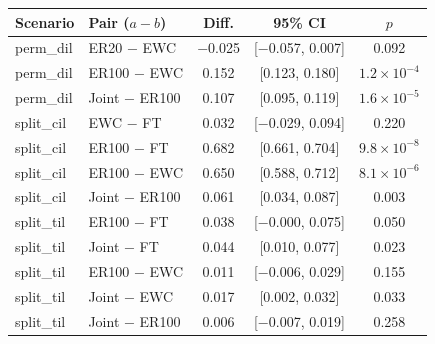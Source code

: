 \begin{tabular}{llccc}
\toprule
Scenario & Pair ($a-b$) & Diff. & 95\% CI & $p$ \\
\midrule
perm\_dil & ER20 $-$ EWC & $-$0.025 & [$-$0.057, 0.007] & 0.092 \\
perm\_dil & ER100 $-$ EWC & 0.152 & [0.123, 0.180] & $1.2{\times}10^{-4}$ \\
perm\_dil & Joint $-$ ER100 & 0.107 & [0.095, 0.119] & $1.6{\times}10^{-5}$ \\
\midrule
split\_cil & EWC $-$ FT & 0.032 & [$-$0.029, 0.094] & 0.220 \\
split\_cil & ER100 $-$ FT & 0.682 & [0.661, 0.704] & $9.8{\times}10^{-8}$ \\
split\_cil & ER100 $-$ EWC & 0.650 & [0.588, 0.712] & $8.1{\times}10^{-6}$ \\
split\_cil & Joint $-$ ER100 & 0.061 & [0.034, 0.087] & 0.003 \\
\midrule
split\_til & ER100 $-$ FT & 0.038 & [$-$0.000, 0.075] & 0.050 \\
split\_til & Joint $-$ FT & 0.044 & [0.010, 0.077] & 0.023 \\
split\_til & ER100 $-$ EWC & 0.011 & [$-$0.006, 0.029] & 0.155 \\
split\_til & Joint $-$ EWC & 0.017 & [0.002, 0.032] & 0.033 \\
split\_til & Joint $-$ ER100 & 0.006 & [$-$0.007, 0.019] & 0.258 \\
\bottomrule
\end{tabular}
